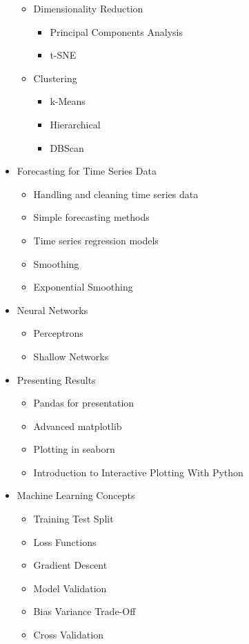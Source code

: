 \documentclass[12pt]{article}
\begin{document}
\begin{itemize}
	\begin{itemize}
		\item Dimensionality Reduction
		\begin{itemize}
			\item Principal Components Analysis
			\item t-SNE
		\end{itemize}
		\item Clustering
		\begin{itemize}
			\item k-Means
			\item Hierarchical
			\item DBScan
		\end{itemize}
	\end{itemize}
	\item Forecasting for Time Series Data
	\begin{itemize}
		\item Handling and cleaning time series data
		\item Simple forecasting methods
		\item Time series regression models
		\item Smoothing
		\item Exponential Smoothing
	\end{itemize}
	\item Neural Networks
	\begin{itemize}
		\item Perceptrons
		\item Shallow Networks
	\end{itemize}
	\item Presenting Results
	\begin{itemize}
		\item Pandas for presentation
		\item Advanced matplotlib
		\item Plotting in seaborn
		\item Introduction to Interactive Plotting With Python
	\end{itemize}
	\item Machine Learning Concepts
	\begin{itemize}
		\item Training Test Split
		\item Loss Functions
		\item Gradient Descent
		\item Model Validation
		\item Bias Variance Trade-Off
		\item Cross Validation
	\end{itemize}
\end{itemize}
\end{document}
